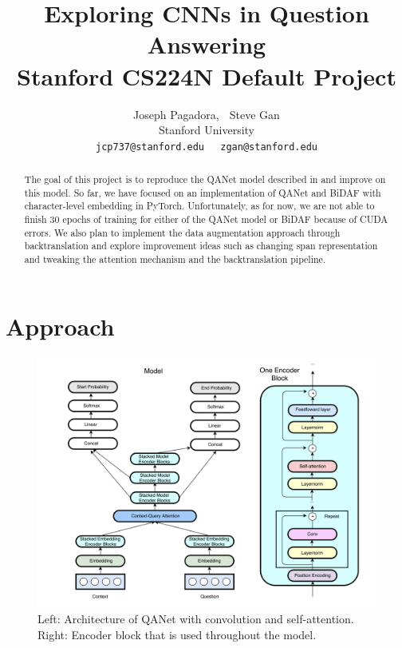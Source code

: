\documentclass{article}
\title{
  Exploring CNNs in Question Answering \\
  \vspace{1em}
  \small{\normalfont Stanford CS224N Default Project}  %
}
\author{
  Joseph Pagadora, $\;$ Steve Gan \\
  Stanford University \\
  \texttt{jcp737@stanford.edu}$\;\;\;\;$
  \texttt{zgan@stanford.edu} \\
}
\begin{document}
\maketitle


\begin{abstract}
The goal of this project is to reproduce the QANet model described in \cite{YU} and improve on this model. So far, we have focused on an implementation of QANet and BiDAF with character-level embedding in PyTorch. Unfortunately, as for now, we are not able to finish 30 epochs of training for either of the QANet model or BiDAF because of CUDA errors. We also plan to implement the data augmentation approach through backtranslation and explore improvement ideas such as changing span representation and tweaking the attention mechanism and the backtranslation pipeline.
\end{abstract}

\section{Approach}

\begin{figure}[h]
\centering
\includegraphics[scale=0.23]{model_diagram}
\caption{Left: Architecture of QANet with convolution and self-attention. Right: Encoder block that is used throughout the model.}
\end{figure}
\end{document}
